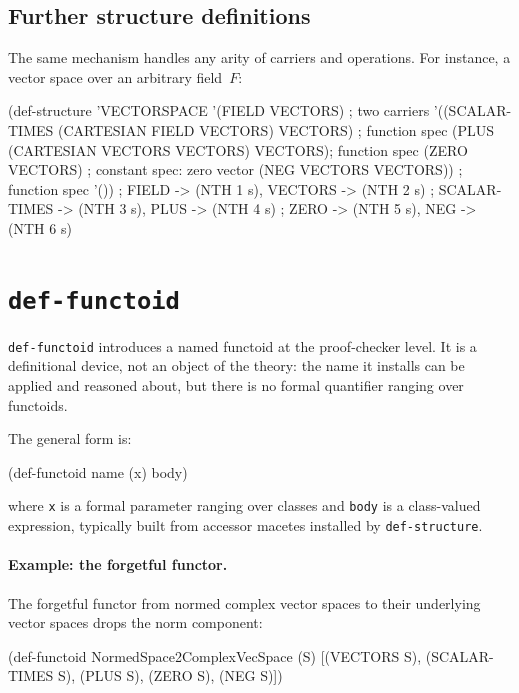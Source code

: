 \documentclass{amsbook}[openany]
\theoremstyle{definition}
\theoremstyle{remark}
\theoremstyle{remark}
\begin{document}
\subsection{Further structure definitions}

The same mechanism handles any arity of carriers and operations.  For
instance, a vector space over an arbitrary field~$F$:

\begin{VNBcode}
(def-structure 'VECTORSPACE
  '(FIELD VECTORS)                 ; two carriers
  '((SCALAR-TIMES (CARTESIAN FIELD VECTORS) VECTORS) ; function spec
    (PLUS         (CARTESIAN VECTORS VECTORS) VECTORS); function spec
    (ZERO         VECTORS)                            ; constant spec: zero vector
    (NEG          VECTORS VECTORS))                   ; function spec
  '())
; FIELD    -> (NTH 1 s),  VECTORS -> (NTH 2 s)
; SCALAR-TIMES -> (NTH 3 s),  PLUS -> (NTH 4 s)
; ZERO     -> (NTH 5 s),  NEG  -> (NTH 6 s)
\end{VNBcode}

\section{\texttt{def-functoid}}
\label{sec:def-functoid}

\texttt{def-functoid} introduces a named functoid at the proof-checker
level.  It is a definitional device, not an object of the theory: the
name it installs can be applied and reasoned about, but there is no
formal quantifier ranging over functoids.

The general form is:
\begin{VNBcode}
(def-functoid name (x) body)
\end{VNBcode}
where \texttt{x} is a formal parameter ranging over classes and
\texttt{body} is a class-valued expression, typically built from
accessor macetes installed by \texttt{def-structure}.

\paragraph{Example: the forgetful functor.}
The forgetful functor from normed complex vector spaces to their
underlying vector spaces drops the norm component:

\begin{VNBcode}
(def-functoid NormedSpace2ComplexVecSpace (S)
  [(VECTORS S), (SCALAR-TIMES S), (PLUS S), (ZERO S), (NEG S)])
\end{VNBcode}
\end{document}
